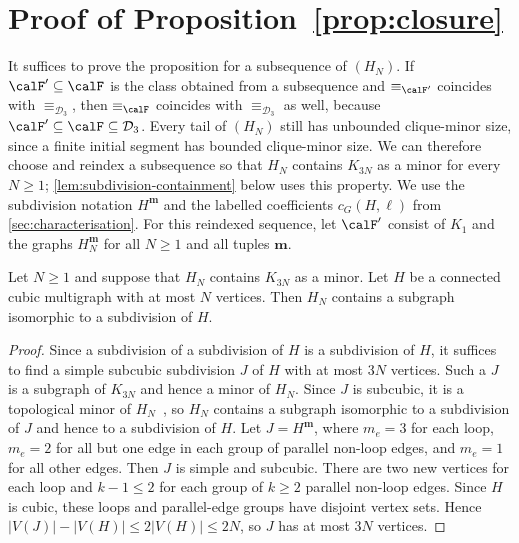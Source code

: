 \section{Proof of Proposition~\ref{prop:closure}}
\label{sec:restriction}

It suffices to prove the proposition for a subsequence of $(H_N)$.
If $\calF'\subseteq\calF$ is the class obtained from a subsequence and
$\equiv_{\calF'}$ coincides with $\equiv_{\mathcal D_3}$, then
$\equiv_{\calF}$ coincides with $\equiv_{\mathcal D_3}$ as well, because
$\calF'\subseteq\calF\subseteq\mathcal D_3$.
Every tail of $(H_N)$ still has unbounded clique-minor size, since a finite
initial segment has bounded clique-minor size. We can therefore choose
and reindex a subsequence so that $H_N$ contains $K_{3N}$ as
a minor for every $N\geq1$; \cref{lem:subdivision-containment} below uses this
property.
We use the subdivision notation $H^{\mathbf m}$ and the labelled
coefficients $c_G(H,\ell)$ from \cref{sec:characterisation}.
For this reindexed sequence, let $\calF'$ consist
of $K_1$ and the graphs $H_N^{\mathbf m}$ for all $N\geq1$ and all tuples $\mathbf m$.

\begin{lemma}\label{lem:subdivision-containment}
 Let $N\geq1$ and suppose that $H_N$ contains $K_{3N}$ as a minor.
 Let $H$ be a connected cubic multigraph with at most $N$ vertices.
 Then $H_N$ contains a subgraph isomorphic to a subdivision of $H$.
\end{lemma}
\begin{proof}
 Since a subdivision of a subdivision of $H$ is a subdivision of $H$, it
 suffices to find a simple subcubic subdivision $J$ of $H$ with at most
 $3N$ vertices. Such a $J$ is a subgraph of $K_{3N}$ and hence a
 minor of $H_N$. Since $J$ is subcubic, it is a topological minor
 of $H_N$~\cite[Section~1.7]{Diestel2017}, so $H_N$ contains a subgraph
 isomorphic to a subdivision of $J$ and hence to a subdivision of $H$.
 Let $J=H^{\mathbf m}$, where $m_e=3$ for each loop, $m_e=2$ for all
 but one edge in each group of parallel non-loop edges, and $m_e=1$
 for all other edges.
 Then $J$ is simple and subcubic. There are two new vertices for each
 loop and $k-1\leq2$ for each group of $k\geq2$ parallel non-loop edges.
 Since $H$ is cubic, these loops and parallel-edge groups have
 disjoint vertex sets. Hence $|V(J)|-|V(H)|\leq2|V(H)|\leq2N$,
 so $J$ has at most $3N$ vertices.
\end{proof}

